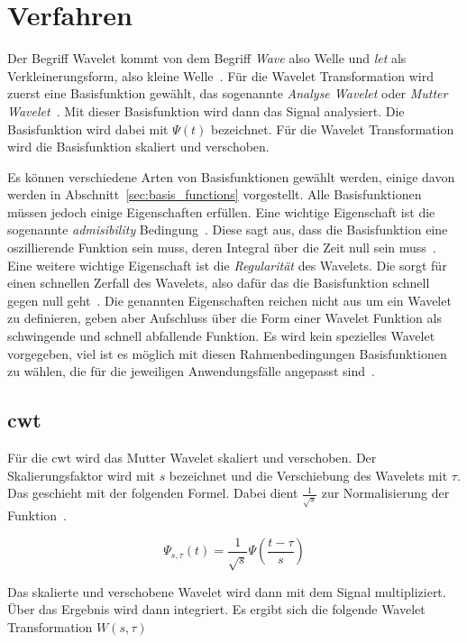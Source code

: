 \documentclass[12pt, a4paper, ngerman]{article}
\begin{document}
\section{Verfahren}
\label{sec:verfahren}

Der Begriff Wavelet kommt von dem Begriff \emph{Wave} also Welle
und \emph{let} als Verkleinerungsform, also kleine Welle~\cite[S.2]{wavelet_patterns}.
Für die Wavelet Transformation wird zuerst eine Basisfunktion gewählt,
das sogenannte \emph{Analyse Wavelet} oder \emph{Mutter Wavelet}~\cite{wavelets_intro}.
Mit dieser Basisfunktion wird dann das Signal analysiert.
Die Basisfunktion wird dabei mit \(\Psi(t)\) bezeichnet.
Für die Wavelet Transformation wird die Basisfunktion skaliert und verschoben.

Es können verschiedene Arten von Basisfunktionen gewählt werden,
einige davon werden in Abschnitt~\ref{sec:basis_functions} vorgestellt.
Alle Basisfunktionen müssen jedoch einige Eigenschaften erfüllen.
Eine wichtige Eigenschaft ist die sogenannte \emph{admisibility} Bedingung~\cite[S.6]{friendly_wavelet}.
Diese sagt aus, dass die Basisfunktion eine oszillierende Funktion sein muss,
deren Integral über die Zeit null sein muss~\cite[S.6]{friendly_wavelet}.
Eine weitere wichtige Eigenschaft ist die \emph{Regularität} des Wavelets.
Die sorgt für einen schnellen Zerfall des Wavelets,
also dafür das die Basisfunktion schnell gegen null geht~\cite[S.6]{friendly_wavelet}.
Die genannten Eigenschaften reichen nicht aus um ein Wavelet zu definieren,
geben aber Aufschluss über die Form einer Wavelet Funktion
als schwingende und schnell abfallende Funktion.
Es wird kein spezielles Wavelet vorgegeben,
viel ist es möglich mit diesen Rahmenbedingungen Basisfunktionen zu wählen,
die für die jeweiligen Anwendungsfälle angepasst sind~\cite[S.5]{friendly_wavelet}.

\subsection{\acl{cwt}}

Für die \ac{cwt} wird das Mutter Wavelet skaliert und verschoben.
Der Skalierungsfaktor wird mit \(s\) bezeichnet
und die Verschiebung des Wavelets mit \(\tau\).
Das geschieht mit der folgenden Formel.
Dabei dient \(\frac{1}{\sqrt{s}}\) zur Normalisierung der Funktion~\cite[S.5]{friendly_wavelet}.

\[
  \Psi_{s,\tau}(t)=\frac{1}{\sqrt{s}}\Psi(\frac{t-\tau}{s})
\]

Das skalierte und verschobene Wavelet wird dann mit dem Signal multipliziert.
Über das Ergebnis wird dann integriert.
Es ergibt sich die folgende Wavelet Transformation \(W(s,\tau)\)~\cite[S.5]{friendly_wavelet}
\end{document}
